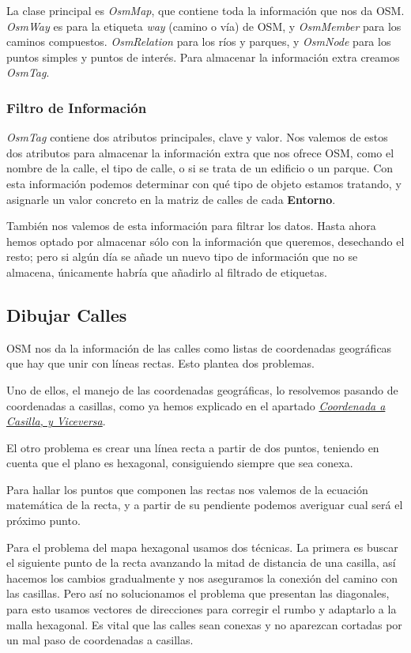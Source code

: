 La clase principal es {\em OsmMap}, que contiene toda la información que nos da
OSM. {\em OsmWay} es para la etiqueta {\em way} (camino o vía) de OSM, y {\em
OsmMember} para los caminos compuestos. {\em OsmRelation} para los ríos y
parques, y {\em OsmNode} para los puntos simples y puntos de interés. Para
almacenar la información extra creamos {\em OsmTag}.

\subsubsection*{Filtro de Información}

{\em OsmTag} contiene dos atributos principales, clave y valor. Nos valemos de
estos dos atributos para almacenar la información extra que nos ofrece OSM, como
el nombre de la calle, el tipo de calle, o si se trata de un edificio o un
parque. Con esta información podemos determinar con qué tipo de objeto estamos
tratando, y asignarle un valor concreto en la matriz de calles de cada {\bf
Entorno}.

También nos valemos de esta información para filtrar los datos. Hasta ahora
hemos optado por almacenar sólo con la información que queremos, desechando el
resto; pero si algún día se añade un nuevo tipo de información que no se
almacena, únicamente habría que añadirlo al filtrado de etiquetas.

\subsection*{Dibujar Calles}

OSM nos da la información de las calles como listas de coordenadas geográficas
que hay que unir con líneas rectas. Esto plantea dos problemas.

Uno de ellos, el manejo de las coordenadas geográficas, lo resolvemos pasando de
coordenadas a casillas, como ya hemos explicado en el apartado
\hyperref[coordToCasilla]{{\em Coordenada a Casilla, y Viceversa}}.

El otro problema es crear una línea recta a partir de dos puntos, teniendo en
cuenta que el plano es hexagonal, consiguiendo siempre que sea conexa.

Para hallar los puntos que componen las rectas nos valemos de la ecuación
matemática de la recta, y a partir de su pendiente podemos averiguar cual será
el próximo punto.

Para el problema del mapa hexagonal usamos dos técnicas. La primera es buscar el
siguiente punto de la recta avanzando la mitad de distancia de una casilla, así
hacemos los cambios gradualmente y nos aseguramos la conexión del camino con
las casillas. Pero así no solucionamos el problema que presentan las diagonales,
para esto usamos vectores de direcciones para corregir el rumbo y adaptarlo a la
malla hexagonal. Es vital que las calles sean conexas y no aparezcan cortadas
por un mal paso de coordenadas a casillas.

